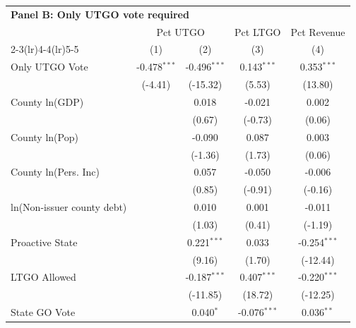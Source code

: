 \begingroup
\centering
\begin{tabular*}{\textwidth}{@{\extracolsep{\fill}}lcccc}
\multicolumn{5}{l}{\textbf{Panel B: Only UTGO vote required}}\\

\addlinespace
   \toprule
    & \multicolumn{2}{c}{Pct UTGO} & Pct LTGO & Pct Revenue\\
   \cmidrule(lr){2-3}\cmidrule(lr){4-4}\cmidrule(lr){5-5}
                              & (1)            & (2)            & (3)            & (4)\\  
   \midrule 
   Only UTGO Vote             & -0.478$^{***}$ & -0.496$^{***}$ & 0.143$^{***}$  & 0.353$^{***}$\\   
                              & (-4.41)       & (-15.32)      & (5.53)        & (13.80)\\   
   County ln(GDP)             &                & 0.018          & -0.021         & 0.002\\   
                              &                & (0.67)        & (-0.73)       & (0.06)\\   
   County ln(Pop)             &                & -0.090         & 0.087          & 0.003\\   
                              &                & (-1.36)       & (1.73)        & (0.06)\\   
   County ln(Pers. Inc)       &                & 0.057          & -0.050         & -0.006\\   
                              &                & (0.85)        & (-0.91)       & (-0.16)\\   
   ln(Non-issuer county debt) &                & 0.010          & 0.001          & -0.011\\   
                              &                & (1.03)        & (0.41)        & (-1.19)\\   
   Proactive State            &                & 0.221$^{***}$  & 0.033          & -0.254$^{***}$\\   
                              &                & (9.16)        & (1.70)        & (-12.44)\\   
   LTGO Allowed               &                & -0.187$^{***}$ & 0.407$^{***}$  & -0.220$^{***}$\\   
                              &                & (-11.85)      & (18.72)       & (-12.25)\\   
   State GO Vote              &                & 0.040$^{*}$    & -0.076$^{***}$ & 0.036$^{**}$\\   

\end{tabular*}
